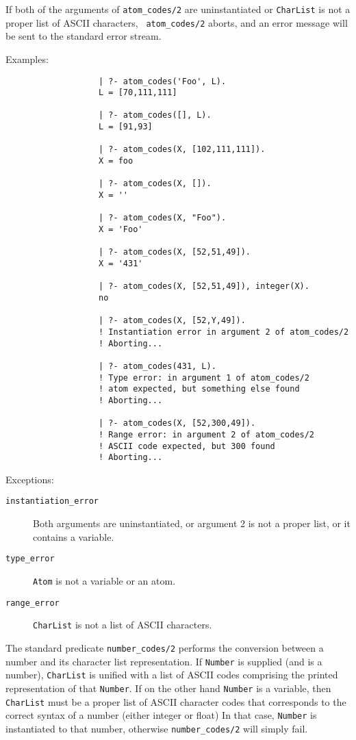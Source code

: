 \begin{description}
    If both of the arguments of {\tt atom\_codes/2} are uninstantiated or
    {\tt CharList} is not a proper list of ASCII characters, {\tt
    atom\_codes/2} aborts, and an error message will be sent to
    the standard error stream.

    Examples:
    {\footnotesize
     \begin{verbatim}
                   | ?- atom_codes('Foo', L).
                   L = [70,111,111]

                   | ?- atom_codes([], L).
                   L = [91,93]

                   | ?- atom_codes(X, [102,111,111]).
                   X = foo
 
                   | ?- atom_codes(X, []).
                   X = ''

                   | ?- atom_codes(X, "Foo").
                   X = 'Foo'

                   | ?- atom_codes(X, [52,51,49]).
                   X = '431'

                   | ?- atom_codes(X, [52,51,49]), integer(X).
                   no

                   | ?- atom_codes(X, [52,Y,49]).
                   ! Instantiation error in argument 2 of atom_codes/2
                   ! Aborting...

                   | ?- atom_codes(431, L).
                   ! Type error: in argument 1 of atom_codes/2
                   ! atom expected, but something else found
                   ! Aborting...

                   | ?- atom_codes(X, [52,300,49]).
                   ! Range error: in argument 2 of atom_codes/2
                   ! ASCII code expected, but 300 found
                   ! Aborting...
     \end{verbatim}}

    Exceptions:
    \begin{description}
    \item[{\tt instantiation\_error}]
	Both arguments are uninstantiated, or argument 2
	is not a proper list, or it contains a variable.
    \item[{\tt type\_error}]
	{\tt Atom} is not a variable or an atom.
    \item[{\tt range\_error}]
	{\tt CharList} is not a list of ASCII characters.
    \end{description}

    The standard predicate {\tt number\_codes/2} performs the conversion 
    between a number and its character list representation. 
    If {\tt Number} is supplied (and is a number), {\tt CharList} is
    unified with a list of ASCII codes comprising the printed representation
    of that {\tt Number}.  If on the other hand {\tt Number} is a variable, 
    then {\tt CharList} must be a proper list of ASCII character codes that
    corresponds to the correct syntax of a number (either integer or float)
    In that case, {\tt Number} is instantiated to that number, otherwise
    {\tt number\_codes/2} will simply fail.


\end{description}
